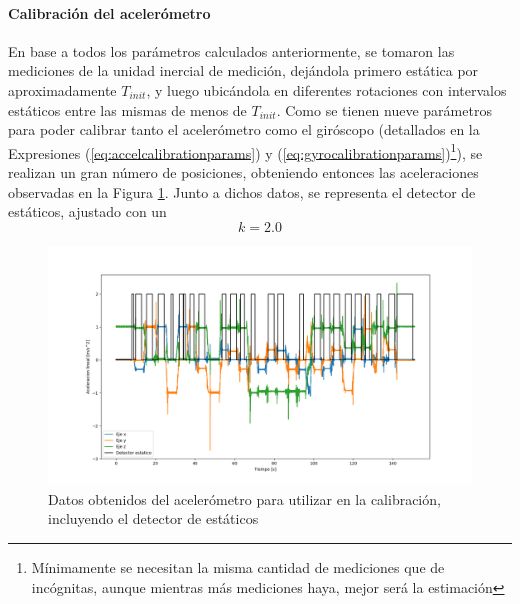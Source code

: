 \paragraph{Calibración del acelerómetro}
En base a todos los parámetros calculados anteriormente, se tomaron las mediciones de la unidad inercial de medición, dejándola primero estática por aproximadamente $T_{init}$, y luego ubicándola en diferentes rotaciones con intervalos estáticos entre las mismas de menos de $T_{init}$. Como se tienen nueve parámetros para poder calibrar tanto el acelerómetro como el giróscopo (detallados en la Expresiones (\ref{eq:accelcalibrationparams}) y (\ref{eq:gyrocalibrationparams})\footnote{Mínimamente se necesitan la misma cantidad de mediciones que de incógnitas, aunque mientras más mediciones haya, mejor será la estimación}), se realizan un gran número de posiciones, obteniendo entonces las aceleraciones observadas en la Figura \ref{fig:imugyroaccelcal}. Junto a dichos datos, se representa el detector de estáticos, ajustado con un
\begin{equation}
    k = 2.0
\end{equation}
\begin{figure}
    \centering
    \includegraphics[width=\textwidth]{Img/IMUGyroAccelCal.png}
    \caption{Datos obtenidos del acelerómetro para utilizar en la calibración, incluyendo el detector de estáticos}
    \label{fig:imugyroaccelcal}
\end{figure}

